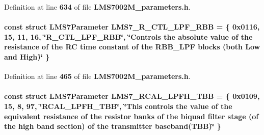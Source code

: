 Definition at line {\bf 634} of file {\bf L\+M\+S7002\+M\+\_\+parameters.\+h}.

\paragraph[{L\+M\+S7\+\_\+\+R\+\_\+\+C\+T\+L\+\_\+\+L\+P\+F\+\_\+\+R\+BB}]{\setlength{\rightskip}{0pt plus 5cm}const struct {\bf L\+M\+S7\+Parameter} L\+M\+S7\+\_\+\+R\+\_\+\+C\+T\+L\+\_\+\+L\+P\+F\+\_\+\+R\+BB = \{ 0x0116, 15, 11, 16, \char`\"{}\+R\+\_\+\+C\+T\+L\+\_\+\+L\+P\+F\+\_\+\+R\+B\+B\char`\"{}, \char`\"{}\+Controls the absolute value of the resistance of the R\+C time constant of the R\+B\+B\+\_\+\+L\+P\+F blocks (both Low and High)\char`\"{} \}\hspace{0.3cm}{\ttfamily [static]}}\label{LMS7002M__parameters_8h_aa359e6f9a509544bbe894f18facbe813}


Definition at line {\bf 465} of file {\bf L\+M\+S7002\+M\+\_\+parameters.\+h}.

\paragraph[{L\+M\+S7\+\_\+\+R\+C\+A\+L\+\_\+\+L\+P\+F\+H\+\_\+\+T\+BB}]{\setlength{\rightskip}{0pt plus 5cm}const struct {\bf L\+M\+S7\+Parameter} L\+M\+S7\+\_\+\+R\+C\+A\+L\+\_\+\+L\+P\+F\+H\+\_\+\+T\+BB = \{ 0x0109, 15, 8, 97, \char`\"{}\+R\+C\+A\+L\+\_\+\+L\+P\+F\+H\+\_\+\+T\+B\+B\char`\"{}, \char`\"{}\+This controls the value of the equivalent resistance of the resistor banks of the biquad filter stage (of the high band section) of the transmitter baseband(\+T\+B\+B)\char`\"{} \}\hspace{0.3cm}{\ttfamily [static]}}\label{LMS7002M__parameters_8h_a4cd7624cd8a7904f21b86c93ba0dfcc0}


